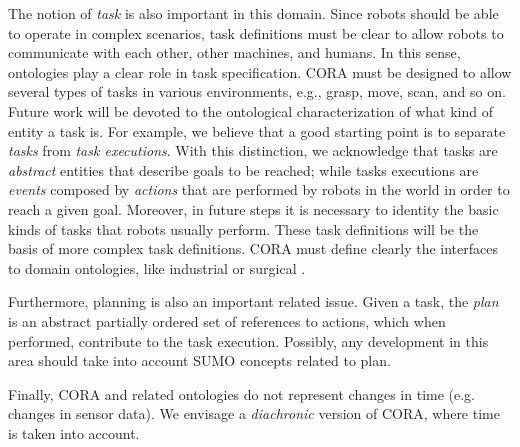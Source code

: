 \documentclass[preprint,12pt]{elsarticle}
\newcommand{\hlc}[2][yellow]{ {\sethlcolor{#1} \hl{#2}} }
\newcommand{\paulo}[1]{{\hlc[cyan]{\textbf{Paulo}: #1}}}
\begin{document}
The notion of \emph{task} is also important in this domain. Since robots should be able to operate in complex scenarios, task definitions must be clear to allow robots to communicate with each other, other machines, and humans. In this sense, ontologies play a clear role in task specification. CORA must be designed to allow several types of tasks in various environments, e.g., grasp, move, scan, and so on. Future work will be devoted to the ontological characterization of what kind of entity a task is. For example, we believe that a good starting point is to separate \emph{tasks} from \emph{task executions}. With this distinction, we acknowledge that tasks are \emph{abstract} entities that describe goals to be reached; while tasks executions are \emph{events} composed by \emph{actions} that are performed by robots in the world in order to reach a given goal. Moreover, in future steps it is necessary to identity the basic kinds of tasks that robots usually perform. These task definitions will be the basis of more complex task definitions. CORA must define clearly the interfaces to domain ontologies, like industrial \cite{BalakirskyKKPSG13} or surgical \cite{hamlyn_paulo_2013} \cite{haidegger2013RAS}.

Furthermore, planning is also an important related issue. Given a task, the \emph{plan} is an abstract partially ordered set of references to actions, which when performed, contribute to the task execution. Possibly, any development in this area should take into account SUMO concepts related to plan.

Finally, CORA and related ontologies do not represent changes in time (e.g. changes in sensor data). We envisage a \emph{diachronic} version of CORA, where time is taken into account. 




\end{document}
